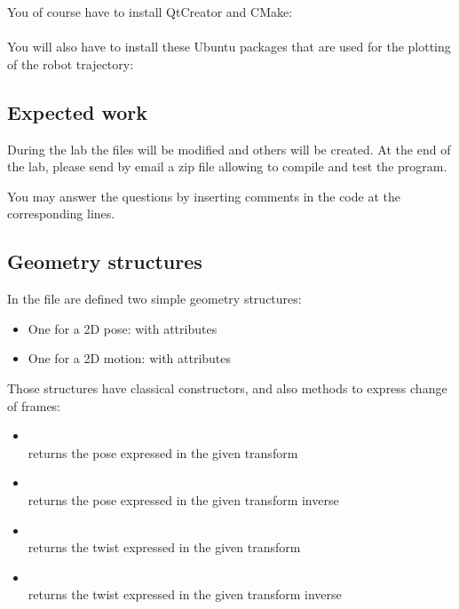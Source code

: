 \documentclass{ecnreport}
\begin{document}
You of course have to install QtCreator and CMake:\\
 \\

You will also have to install these Ubuntu packages that are used for the plotting of the robot trajectory:\\

\subsection{Expected work}

During the lab the files will be modified and others will be created.
At the end of the lab, please send by email a zip file allowing to compile and test the program.

You may answer the questions by inserting comments in the code at the corresponding lines.

\subsection{Geometry structures}

In the  file are defined two simple geometry structures:
\begin{itemize}
 \item One for a 2D pose:  with attributes 
 \item One for a 2D motion:  with attributes 
\end{itemize}Those structures have classical constructors, and also methods to express change of frames:
\begin{itemize}
 \item {} \\returns the pose  expressed in the given transform
 \item {}\\ returns the pose expressed in the given transform inverse
 \item {} \\returns the twist expressed in the given transform
 \item {}\\ returns the twist expressed in the given transform inverse
 \end{itemize}
\end{document}
